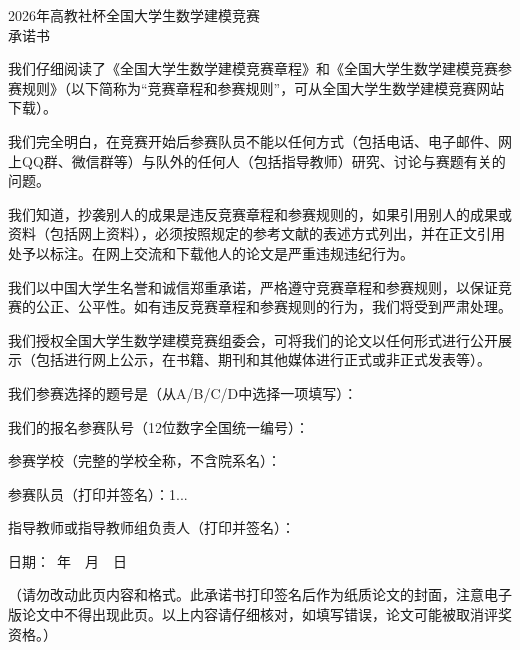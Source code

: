 \thispagestyle{empty}
\begin{center}
  {\heiti 2026年高教社杯全国大学生数学建模竞赛}\\[6pt]
  {\heiti 承\quad 诺\quad 书}
\end{center}

\vspace{1em}
我们仔细阅读了《全国大学生数学建模竞赛章程》和《全国大学生数学建模竞赛参赛规则》（以下简称为“竞赛章程和参赛规则”，可从全国大学生数学建模竞赛网站下载）。

我们完全明白，在竞赛开始后参赛队员不能以任何方式（包括电话、电子邮件、网上QQ群、微信群等）与队外的任何人（包括指导教师）研究、讨论与赛题有关的问题。

我们知道，抄袭别人的成果是违反竞赛章程和参赛规则的，如果引用别人的成果或资料（包括网上资料），必须按照规定的参考文献的表述方式列出，并在正文引用处予以标注。在网上交流和下载他人的论文是严重违规违纪行为。

我们以中国大学生名誉和诚信郑重承诺，严格遵守竞赛章程和参赛规则，以保证竞赛的公正、公平性。如有违反竞赛章程和参赛规则的行为，我们将受到严肃处理。

我们授权全国大学生数学建模竞赛组委会，可将我们的论文以任何形式进行公开展示（包括进行网上公示，在书籍、期刊和其他媒体进行正式或非正式发表等）。

\vspace{1em}
我们参赛选择的题号是（从A/B/C/D中选择一项填写）：\underline{}\par
我们的报名参赛队号（12位数字全国统一编号）：\underline{\makebox[12em]{}}\par
参赛学校（完整的学校全称，不含院系名）：\underline{\makebox[12em]{}}\par

\vspace{1.2em}
参赛队员（打印并签名）：1.\underline{\makebox[5.5em]{}}.\underline{\makebox[5.5em]{}}.\underline{\makebox[5.5em]{}}\par
\vspace{1.2em}
指导教师或指导教师组负责人（打印并签名）：\underline{\makebox[10em]{}}\par
\vspace{1.2em}
日期：\underline{\makebox[6em]{}}\ 年\ \underline{\makebox[2em]{}}\ 月\ \underline{\makebox[2em]{}}\ 日\par

\vspace{2em}
{
（请勿改动此页内容和格式。此承诺书打印签名后作为纸质论文的封面，注意电子版论文中不得出现此页。以上内容请仔细核对，如填写错误，论文可能被取消评奖资格。）}

\clearpage
